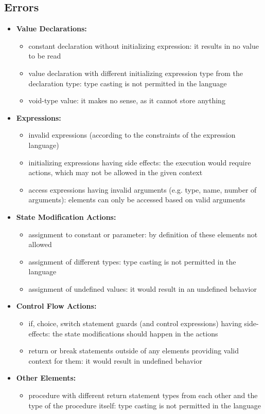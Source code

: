 \subsection{Errors}
\begin{itemize}
	\item \textbf{Value Declarations:}
	\begin{itemize}
		\item constant declaration without initializing expression: it results in no value to be read
		\item value declaration with different initializing expression type from the declaration type: type casting is not permitted in the language
		\item void-type value: it makes no sense, as it cannot store anything
	\end{itemize}
	\item \textbf{Expressions:}
	\begin{itemize}
		\item invalid expressions (according to the constraints of the expression language)
		\item initializing expressions having side effects: the execution would require actions, which may not be allowed in the given context
		\item access expressions having invalid arguments (e.g. type, name, number of arguments): elements can only be accessed based on valid arguments
	\end{itemize}
	\item \textbf{State Modification Actions:}
	\begin{itemize}
		\item assignment to constant or parameter: by definition of these elements not allowed
		\item assignment of different types: type casting is not permitted in the language
		\item assignment of undefined values: it would result in an undefined behavior
	\end{itemize}
	\item \textbf{Control Flow Actions:}
	\begin{itemize}
		\item if, choice, switch statement guards (and control expressions) having side-effects: the state modifications should happen in the actions
		\item return or break statements outside of any elements providing valid context for them: it would result in undefined behavior
	\end{itemize}
	\item \textbf{Other Elements:}
	\begin{itemize}
		\item procedure with different return statement types from each other and the type of the procedure itself: type casting is not permitted in the language
	\end{itemize}
\end{itemize}

